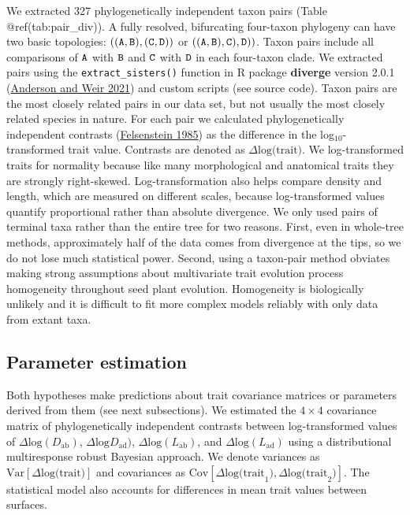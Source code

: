 \documentclass[
  10pt,
]{article}
\begin{document}
We extracted 327 phylogenetically independent taxon pairs (Table @ref(tab:pair\_div)). A fully resolved, bifurcating four-taxon phylogeny can have two basic topologies: \(\tt{((A,B),(C,D))}\) or \(\tt{((A,B),C),D))}\). Taxon pairs include all comparisons of \(\tt{A}\) with \(\tt{B}\) and \(\tt{C}\) with \(\tt{D}\) in each four-taxon clade. We extracted pairs using the \texttt{extract\_sisters()} function in R package \textbf{diverge} version 2.0.1 (\protect\hyperlink{ref-anderson_diverge_2021}{Anderson and Weir 2021}) and custom scripts (see source code). Taxon pairs are the most closely related pairs in our data set, but not usually the most closely related species in nature. For each pair we calculated phylogenetically independent contrasts (\protect\hyperlink{ref-felsenstein_phylogenies_1985}{Felsenstein 1985}) as the difference in the log\(_{10}\)-transformed trait value. Contrasts are denoted as \(\Delta \text{log(trait)}\). We log-transformed traits for normality because like many morphological and anatomical traits they are strongly right-skewed. Log-transformation also helps compare density and length, which are measured on different scales, because log-transformed values quantify proportional rather than absolute divergence. We only used pairs of terminal taxa rather than the entire tree for two reasons. First, even in whole-tree methods, approximately half of the data comes from divergence at the tips, so we do not lose much statistical power. Second, using a taxon-pair method obviates making strong assumptions about multivariate trait evolution process homogeneity throughout seed plant evolution. Homogeneity is biologically unlikely and it is difficult to fit more complex models reliably with only data from extant taxa.

\hypertarget{parameter-estimation}{%
\subsection{Parameter estimation}\label{parameter-estimation}}

Both hypotheses make predictions about trait covariance matrices or parameters derived from them (see next subsections). We estimated the \(4 \times 4\) covariance matrix of phylogenetically independent contrasts between log-transformed values of \(\Delta \text{log}(D_\mathrm{ab})\), \(\Delta \text{log}D_\mathrm{ad})\), \(\Delta \text{log}(L_\mathrm{ab})\), and \(\Delta \text{log}(L_\mathrm{ad})\) using a distributional multiresponse robust Bayesian approach. We denote variances as \(\text{Var}[\Delta \text{log(trait)}]\) and covariances as \(\text{Cov}[\Delta \text{log(trait}_1),\Delta \text{log(trait}_2)]\). The statistical model also accounts for differences in mean trait values between surfaces.
\end{document}
